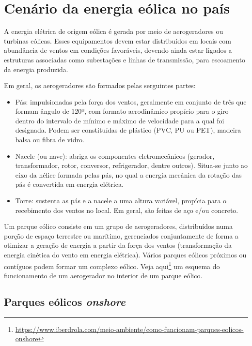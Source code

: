 \documentclass[
  oneside]{scrbook}
\DeclareRobustCommand{\href}[2]{#2\footnote{\url{#1}}}
\begin{document}
\hypertarget{cenuxe1rio-da-energia-euxf3lica-no-pauxeds}{%
\section{Cenário da energia eólica no país}\label{cenuxe1rio-da-energia-euxf3lica-no-pauxeds}}

A energia elétrica de origem eólica é gerada por meio de aerogeradores ou turbinas eólicas. Esses equipamentos devem estar distribuídos em locais com abundância de ventos em condições favoráveis, devendo ainda estar ligados a estruturas associadas como subestações e linhas de transmissão, para escoamento da energia produzida.

Em geral, os aerogeradores são formados pelas serguintes partes:

\begin{itemize}
\item
  Pás: impulsionadas pela força dos ventos, geralmente em conjunto de três que formam ângulo de 120º, com formato aerodinâmico propício para o giro dentro do intervalo de mínimo e máximo de velocidade para a qual foi designada. Podem ser constituídas de plástico (PVC, PU ou PET), madeira balsa ou fibra de vidro.
\item
  Nacele (ou nave): abriga os componentes eletromecânicos (gerador, transformador, rotor, conversor, refrigerador, dentre outros). Situa-se junto ao eixo da hélice formada pelas pás, no qual a energia mecânica da rotação das pás é convertida em energia elétrica.
\item
  Torre: sustenta as pás e a nacele a uma altura variável, propícia para o recebimento dos ventos no local. Em geral, são feitas de aço e/ou concreto.
\end{itemize}

Um parque eólico consiste em um grupo de aerogeradores, distribuídos numa porção de espaço terrestre ou marítimo, gerenciados conjuntamente de forma a otimizar a geração de energia a partir da força dos ventos (transformação da energia cinética do vento em energia elétrica). Vários parques eólicos próximos ou contíguos podem formar um complexo eólico. \href{https://www.iberdrola.com/meio-ambiente/como-funcionam-parques-eolicos-onshore}{Veja aqui} um esquema do funcionamento de um aerogerador no interior de um parque eólico.

\hypertarget{parques-euxf3licos-onshore}{%
\subsection{\texorpdfstring{Parques eólicos \emph{onshore}}{Parques eólicos onshore}}\label{parques-euxf3licos-onshore}}
\end{document}
